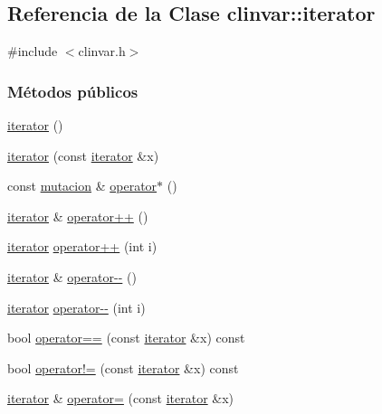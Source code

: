\hypertarget{classclinvar_1_1iterator}{}\subsection{Referencia de la Clase clinvar\+:\+:iterator}
\label{classclinvar_1_1iterator}


{\ttfamily \#include $<$clinvar.\+h$>$}

\subsubsection*{Métodos públicos}
\begin{DoxyCompactItemize}
\item 
\hyperlink{classclinvar_1_1iterator_a34066407440e500f1ae83b1033b2807f}{iterator} ()
\item 
\hyperlink{classclinvar_1_1iterator_aaf0810c92042f15ae30a07c5813c2f19}{iterator} (const \hyperlink{classclinvar_1_1iterator}{iterator} \&x)
\item 
const \hyperlink{classmutacion}{mutacion} \& \hyperlink{classclinvar_1_1iterator_a6a42f3dd729564aa96b51465adfa149b}{operator$\ast$} ()
\item 
\hyperlink{classclinvar_1_1iterator}{iterator} \& \hyperlink{classclinvar_1_1iterator_ac7a5df4d10cce4a27d4e8c9d69b2137a}{operator++} ()
\item 
\hyperlink{classclinvar_1_1iterator}{iterator} \hyperlink{classclinvar_1_1iterator_adca976dc3f9879e7d23230499a6f56ee}{operator++} (int i)
\item 
\hyperlink{classclinvar_1_1iterator}{iterator} \& \hyperlink{classclinvar_1_1iterator_abfe6ea7ab97e9cffc3775cae5d5f13fd}{operator-\/-\/} ()
\item 
\hyperlink{classclinvar_1_1iterator}{iterator} \hyperlink{classclinvar_1_1iterator_a7abaee12f1af64c7c9b9190a90ff56da}{operator-\/-\/} (int i)
\item 
bool \hyperlink{classclinvar_1_1iterator_a2257d5915be4cbd91912c923605faf57}{operator==} (const \hyperlink{classclinvar_1_1iterator}{iterator} \&x) const 
\item 
bool \hyperlink{classclinvar_1_1iterator_a635712e0d721f3f5ec59349340430c60}{operator!=} (const \hyperlink{classclinvar_1_1iterator}{iterator} \&x) const 
\item 
\hyperlink{classclinvar_1_1iterator}{iterator} \& \hyperlink{classclinvar_1_1iterator_aefe2f35b7864297a94908b11d3859b53}{operator=} (const \hyperlink{classclinvar_1_1iterator}{iterator} \&x)
\end{DoxyCompactItemize}

